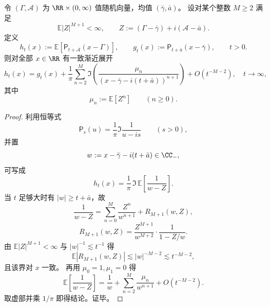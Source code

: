 \begin{theorem}\label{thm:xi-poisson-cauchy-complex-stieltjes-full-expansion}
令 \((\Gamma,\mathcal A)\) 为 \(\RR\times(0,\infty)\) 值随机向量，均值 \((\bar\gamma,\bar a)\)。
设对某个整数 \(M\ge 2\) 满足
\[
\mathbb E|Z|^{M+1}<\infty,\qquad
Z:=(\Gamma-\bar\gamma)+i(\mathcal A-\bar a).
\]
定义
\[
h_t(x):=\mathbb E\!\left[\mathsf P_{t+\mathcal A}(x-\Gamma)\right],\qquad
g_t(x):=\mathsf P_{t+\bar a}(x-\bar\gamma),\qquad t>0.
\]
则对全部 \(x\in\RR\) 有一致渐近展开
\[
\boxed{
h_t(x)
=g_t(x)+\frac1\pi\sum_{n=2}^{M}
\Im\!\left(\frac{\mu_n}{(x-\bar\gamma-i(t+\bar a))^{n+1}}\right)
+O(t^{-M-2}),\quad t\to\infty,}
\]
其中
\[
\mu_n:=\mathbb E[Z^n]\qquad(n\ge 0).
\]
\end{theorem}
\begin{proof}
利用恒等式
\[
\mathsf P_s(u)=\frac1\pi\Im\frac{1}{u-is}\qquad(s>0),
\]
并置
\[
w:=x-\bar\gamma-i(t+\bar a)\in\CC_{-},
\]
可写成
\[
h_t(x)=\frac1\pi\,\Im\,\mathbb E\!\left[\frac{1}{w-Z}\right].
\]
当 \(t\) 足够大时有 \(|w|\ge t+\bar a\)，故
\[
\frac{1}{w-Z}
=\sum_{n=0}^{M}\frac{Z^n}{w^{n+1}}+R_{M+1}(w,Z),
\]
\[
R_{M+1}(w,Z)=\frac{Z^{M+1}}{w^{M+2}}\cdot \frac{1}{1-Z/w}.
\]
由 \(\mathbb E|Z|^{M+1}<\infty\) 与 \(|w|^{-1}\lesssim t^{-1}\) 得
\[
\mathbb E|R_{M+1}(w,Z)|\lesssim |w|^{-M-2}\lesssim t^{-M-2},
\]
且该界对 \(x\) 一致。
再用 \(\mu_0=1,\mu_1=0\) 得
\[
\mathbb E\!\left[\frac{1}{w-Z}\right]
=\frac1w+\sum_{n=2}^{M}\frac{\mu_n}{w^{n+1}}+O(t^{-M-2}).
\]
取虚部并乘 \(1/\pi\) 即得结论。证毕。
\end{proof}

